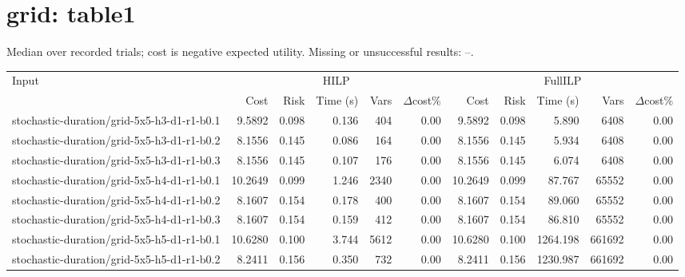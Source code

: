 \documentclass[10pt]{article}
\begin{document}
\section*{grid: table1}
\noindent Median over recorded trials; cost is negative expected utility. Missing or unsuccessful results: --.\par
\small\begin{tabular}{p{65mm}rrrrrrrrrr}
\toprule
Input & \multicolumn{5}{c}{HILP} & \multicolumn{5}{c}{FullILP} \\
 & Cost & Risk & Time (s) & Vars & $\Delta$cost\% & Cost & Risk & Time (s) & Vars & $\Delta$cost\% \\
\midrule
stochastic-\allowbreak duration/\allowbreak grid-\allowbreak 5x5-\allowbreak h3-\allowbreak d1-\allowbreak r1-\allowbreak b0.1 & 9.5892 & 0.098 & 0.136 & 404 & 0.00 & 9.5892 & 0.098 & 5.890 & 6408 & 0.00 \\
stochastic-\allowbreak duration/\allowbreak grid-\allowbreak 5x5-\allowbreak h3-\allowbreak d1-\allowbreak r1-\allowbreak b0.2 & 8.1556 & 0.145 & 0.086 & 164 & 0.00 & 8.1556 & 0.145 & 5.934 & 6408 & 0.00 \\
stochastic-\allowbreak duration/\allowbreak grid-\allowbreak 5x5-\allowbreak h3-\allowbreak d1-\allowbreak r1-\allowbreak b0.3 & 8.1556 & 0.145 & 0.107 & 176 & 0.00 & 8.1556 & 0.145 & 6.074 & 6408 & 0.00 \\
stochastic-\allowbreak duration/\allowbreak grid-\allowbreak 5x5-\allowbreak h4-\allowbreak d1-\allowbreak r1-\allowbreak b0.1 & 10.2649 & 0.099 & 1.246 & 2340 & 0.00 & 10.2649 & 0.099 & 87.767 & 65552 & 0.00 \\
stochastic-\allowbreak duration/\allowbreak grid-\allowbreak 5x5-\allowbreak h4-\allowbreak d1-\allowbreak r1-\allowbreak b0.2 & 8.1607 & 0.154 & 0.178 & 400 & 0.00 & 8.1607 & 0.154 & 89.060 & 65552 & 0.00 \\
stochastic-\allowbreak duration/\allowbreak grid-\allowbreak 5x5-\allowbreak h4-\allowbreak d1-\allowbreak r1-\allowbreak b0.3 & 8.1607 & 0.154 & 0.159 & 412 & 0.00 & 8.1607 & 0.154 & 86.810 & 65552 & 0.00 \\
stochastic-\allowbreak duration/\allowbreak grid-\allowbreak 5x5-\allowbreak h5-\allowbreak d1-\allowbreak r1-\allowbreak b0.1 & 10.6280 & 0.100 & 3.744 & 5612 & 0.00 & 10.6280 & 0.100 & 1264.198 & 661692 & 0.00 \\
stochastic-\allowbreak duration/\allowbreak grid-\allowbreak 5x5-\allowbreak h5-\allowbreak d1-\allowbreak r1-\allowbreak b0.2 & 8.2411 & 0.156 & 0.350 & 732 & 0.00 & 8.2411 & 0.156 & 1230.987 & 661692 & 0.00 \\

\end{tabular}
\end{document}
